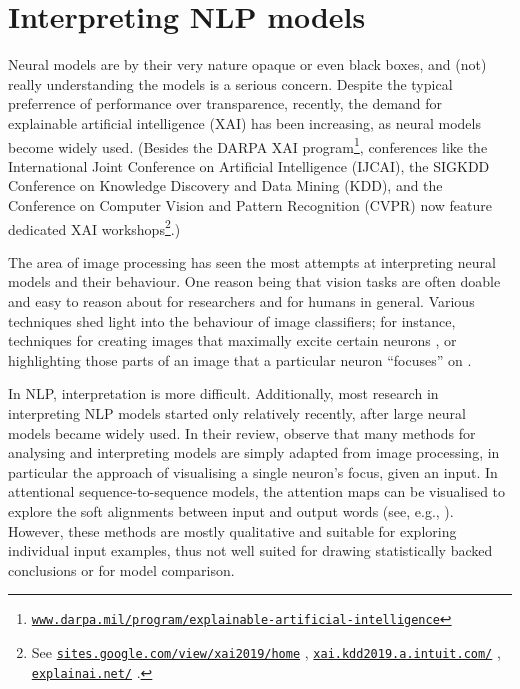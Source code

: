 \documentclass[bsc,frontabs,singlespacing,parskip,deptreport]{infthesis}
\newcommand\rurl[1]{%
  \href{https://#1}{\nolinkurl{#1}}%
}
\begin{document}
{  \section{Interpreting NLP models}{
    \label{sec:understanding-models}
    Neural models are by their very nature opaque or even black boxes, and (not) really understanding the models is a serious concern.
    Despite the typical preferrence of performance over transparence, recently, the demand for explainable artificial intelligence (XAI) has been increasing, as neural models become widely used. (Besides the DARPA XAI program\footnote{\rurl{www.darpa.mil/program/explainable-artificial-intelligence}}, conferences like the International Joint Conference on Artificial Intelligence (IJCAI), the SIGKDD Conference on Knowledge Discovery and Data Mining (KDD), and the Conference on Computer Vision and Pattern Recognition (CVPR) now feature dedicated XAI workshops\footnote{See \rurl{sites.google.com/view/xai2019/home}, \rurl{xai.kdd2019.a.intuit.com/}, \rurl{explainai.net/}.}.)

    The area of image processing has seen the most attempts at interpreting neural models and their behaviour. One reason being that vision tasks are often doable and easy to reason about for researchers and for humans in general. Various techniques shed light into the behaviour of image classifiers; for instance, techniques for creating images that maximally excite certain neurons \citep{Simonyan_2013}, or highlighting those parts of an image that a particular neuron ``focuses'' on \citep{Zeiler_2013}. 
    
    In NLP, interpretation is more difficult. Additionally, most research in interpreting NLP models started only relatively recently, after large neural models became widely used.
    In their review, \citet{Belinkov_2018} observe that many methods for analysing and interpreting models are simply adapted from image processing, in particular the approach of visualising a single neuron's focus, given an input.
    In attentional sequence-to-sequence models, the attention maps can be visualised to explore the soft alignments between input and output words (see, e.g., \citet{Strobelt_2018}). However, these methods are mostly qualitative and suitable for exploring individual input examples, thus not well suited for drawing statistically backed conclusions or for model comparison.
    
}}
\end{document}
